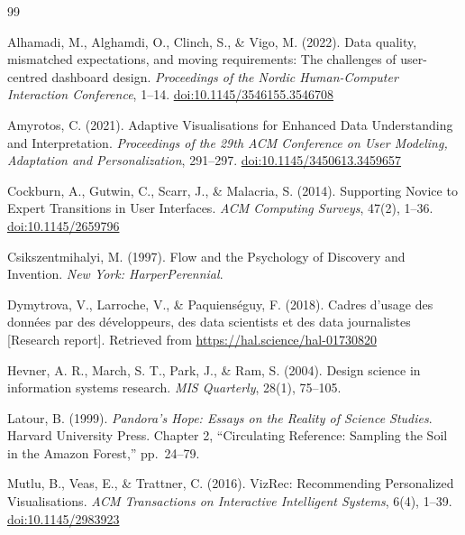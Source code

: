 \documentclass[12pt,a4paper]{article}
\providecommand{\doi}[1]{\href{https://doi.org/#1}{doi:#1}}
\begin{document}

\begin{thebibliography}{99}

Alhamadi, M., Alghamdi, O., Clinch, S., \& Vigo, M. (2022).
\newblock Data quality, mismatched expectations, and moving requirements: The challenges of user-centred dashboard design.
\newblock \textit{Proceedings of the Nordic Human-Computer Interaction Conference}, 1--14.
\newblock \doi{10.1145/3546155.3546708}


 Amyrotos, C. (2021).
 \newblock Adaptive Visualisations for Enhanced Data Understanding and Interpretation.
 \newblock \textit{Proceedings of the 29th ACM Conference on User Modeling, Adaptation and Personalization}, 291--297.
 \newblock \doi{10.1145/3450613.3459657}

 Cockburn, A., Gutwin, C., Scarr, J., \& Malacria, S. (2014).
 \newblock Supporting Novice to Expert Transitions in User Interfaces.
 \newblock \textit{ACM Computing Surveys}, 47(2), 1--36.
 \newblock \doi{10.1145/2659796}

Csikszentmihalyi, M. (1997). Flow and the Psychology of Discovery and Invention. \textit{New York: HarperPerennial}.

Dymytrova, V., Larroche, V., \& Paquienséguy, F. (2018).
\newblock Cadres d'usage des données par des développeurs, des data scientists et des data journalistes [Research report].
\newblock Retrieved from \url{https://hal.science/hal-01730820}

Hevner, A. R., March, S. T., Park, J., \& Ram, S. (2004).
\newblock Design science in information systems research.
\newblock \textit{MIS Quarterly}, 28(1), 75--105.

Latour, B. (1999).
\newblock \textit{Pandora's Hope: Essays on the Reality of Science Studies}.
\newblock Harvard University Press. Chapter 2, ``Circulating Reference: Sampling the Soil in the Amazon Forest,'' pp.~24--79.

 Mutlu, B., Veas, E., \& Trattner, C. (2016).
 \newblock VizRec: Recommending Personalized Visualisations.
 \newblock \textit{ACM Transactions on Interactive Intelligent Systems}, 6(4), 1--39.
 \newblock \doi{10.1145/2983923}


\end{thebibliography}
\end{document}
